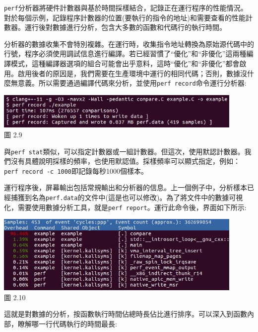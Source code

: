 \texttt{perf}分析器將硬件計數器與基於時間採樣結合，記錄正在運行程序的性能情況。對於每個示例，記錄程序計數器的位置(要執行的指令的地址)和需要查看的性能計數器。運行後對數據進行分析，包含大多數的函數和代碼行的執行時間。

分析器的數據收集不會特別複雜。在運行時，收集指令地址轉換為原始源代碼中的行號，程序必須使用調試信息進行編譯。若已經習慣了“優化”和“非優化”這兩種編譯模式，這種編譯器選項的組合可能會出乎意料，這時“優化”和“非優化”都會啟用。啟用後者的原因是，我們需要在生產環境中運行的相同代碼；否則，數據沒什麼無意義。所以需要通過編譯代碼來分析，並使用\texttt{perf record}命令運行分析器:

\begin{center}
\includegraphics[width=0.9\textwidth]{content/1/chapter2/images/9.jpg}\\
圖 2.9
\end{center}

與\texttt{perf stat}類似，可以指定計數器或一組計數器。但這次，使用默認計數器。我們沒有具體說明採樣的頻率，也使用默認值。採樣頻率可以顯式指定，例如：\texttt{perf record -c 1000}即記錄每秒1000個樣本。

運行程序後，屏幕輸出包括常規輸出和分析器的信息。上一個例子中，分析樣本已經捕獲到名為\texttt{perf.data}的文件中(這是也可以修改)。為了將文件中的數據可視化，需要使用數據分析工具，就是\texttt{perf report}。運行此命令後，界面如下所示:

\begin{center}
\includegraphics[width=0.9\textwidth]{content/1/chapter2/images/10.jpg}\\
圖 2.10
\end{center}

這就是對數據的分析，按函數執行時間佔總時長佔比進行排序。可以深入到函數內部，瞭解哪一行代碼執行的時間最長:

